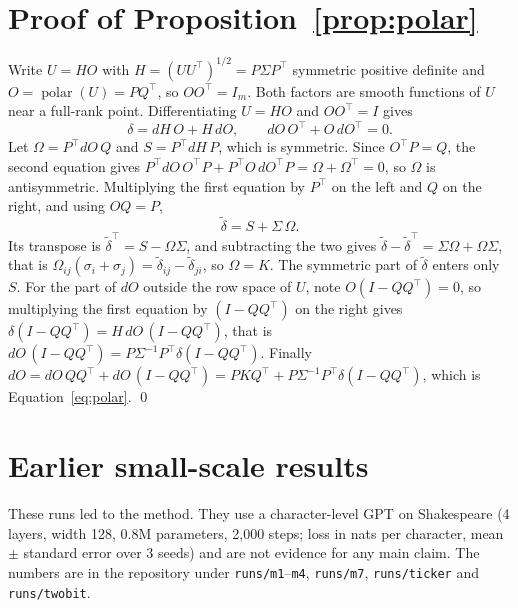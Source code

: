 \documentclass[11pt]{article}
\newcommand{\polar}{\operatorname{polar}}
\begin{document}



\appendix
\section{Proof of Proposition~\ref{prop:polar}}\label{app:proof}
Write $U = HO$ with $H = (UU^\top)^{1/2} = P\Sigma P^\top$ symmetric positive definite and $O = \polar(U) = PQ^\top$,
so $OO^\top = I_m$. Both factors are smooth functions of $U$ near a full-rank point. Differentiating
$U = HO$ and $OO^\top = I$ gives
\[
  \delta = dH\,O + H\,dO, \qquad dO\,O^\top + O\,dO^\top = 0 .
\]
Let $\Omega = P^\top dO\, Q$ and $S = P^\top dH\, P$, which is symmetric. Since $O^\top P = Q$, the second equation
gives $P^\top dO\,O^\top P + P^\top O\,dO^\top P = \Omega + \Omega^\top = 0$, so $\Omega$ is antisymmetric. Multiplying the
first equation by $P^\top$ on the left and $Q$ on the right, and using $OQ = P$,
\[
  \tilde\delta = S + \Sigma\,\Omega .
\]
Its transpose is $\tilde\delta^\top = S - \Omega\Sigma$, and subtracting the two gives
$\tilde\delta - \tilde\delta^\top = \Sigma\Omega + \Omega\Sigma$, that is
$\Omega_{ij}(\sigma_i + \sigma_j) = \tilde\delta_{ij} - \tilde\delta_{ji}$, so $\Omega = K$. The symmetric part of
$\tilde\delta$ enters only $S$. For the part of $dO$ outside the row space of $U$, note $O(I - QQ^\top) = 0$, so
multiplying the first equation by $(I - QQ^\top)$ on the right gives $\delta(I - QQ^\top) = H\,dO\,(I - QQ^\top)$, that
is $dO\,(I - QQ^\top) = P\Sigma^{-1}P^\top\delta(I - QQ^\top)$. Finally
$dO = dO\,QQ^\top + dO\,(I - QQ^\top) = PKQ^\top + P\Sigma^{-1}P^\top\delta(I-QQ^\top)$, which is
Equation~\eqref{eq:polar}. \qed

\section{Earlier small-scale results}\label{app:toy}
These runs led to the method. They use a character-level GPT on Shakespeare (4 layers, width 128, 0.8M parameters,
2,000 steps; loss in nats per character, mean $\pm$ standard error over 3 seeds) and are not evidence for any main
claim. The numbers are in the repository under \texttt{runs/m1}--\texttt{m4}, \texttt{runs/m7}, \texttt{runs/ticker}
and \texttt{runs/twobit}.
\end{document}
